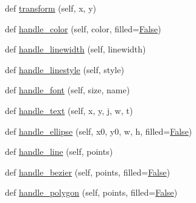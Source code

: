\begin{DoxyCompactItemize}
\item 
def \hyperlink{classsmacc__viewer_1_1xdot_1_1xdot_1_1XDotAttrParser_ad3be1e9782edc07698a04d232c5fc02b}{transform} (self, x, y)
\item 
def \hyperlink{classsmacc__viewer_1_1xdot_1_1xdot_1_1XDotAttrParser_a12bdb9eaa41346cb59da418082e9d593}{handle\+\_\+color} (self, color, filled=\hyperlink{namespacesmacc__viewer_a5928e8da279785cbab9011356c3eaa87}{False})
\item 
def \hyperlink{classsmacc__viewer_1_1xdot_1_1xdot_1_1XDotAttrParser_ae95c3f6623712f78a11bebd32cc9ff0f}{handle\+\_\+linewidth} (self, linewidth)
\item 
def \hyperlink{classsmacc__viewer_1_1xdot_1_1xdot_1_1XDotAttrParser_af20401187b9882d95a52efa2e60701cc}{handle\+\_\+linestyle} (self, style)
\item 
def \hyperlink{classsmacc__viewer_1_1xdot_1_1xdot_1_1XDotAttrParser_a48085d32c8d968444dda73eed027fa74}{handle\+\_\+font} (self, size, name)
\item 
def \hyperlink{classsmacc__viewer_1_1xdot_1_1xdot_1_1XDotAttrParser_a77cca3ea20aaf8b6caf2c41705b1611f}{handle\+\_\+text} (self, x, y, j, w, t)
\item 
def \hyperlink{classsmacc__viewer_1_1xdot_1_1xdot_1_1XDotAttrParser_adc9b09c15320e5aebc7f2ddaa3012aa5}{handle\+\_\+ellipse} (self, x0, y0, w, h, filled=\hyperlink{namespacesmacc__viewer_a5928e8da279785cbab9011356c3eaa87}{False})
\item 
def \hyperlink{classsmacc__viewer_1_1xdot_1_1xdot_1_1XDotAttrParser_adc6f90163757276b983f4701e240a011}{handle\+\_\+line} (self, points)
\item 
def \hyperlink{classsmacc__viewer_1_1xdot_1_1xdot_1_1XDotAttrParser_a17a326016861ed874135b3c4a55cbabe}{handle\+\_\+bezier} (self, points, filled=\hyperlink{namespacesmacc__viewer_a5928e8da279785cbab9011356c3eaa87}{False})
\item 
def \hyperlink{classsmacc__viewer_1_1xdot_1_1xdot_1_1XDotAttrParser_a52d83c9c11f45a1587ef9a7942435615}{handle\+\_\+polygon} (self, points, filled=\hyperlink{namespacesmacc__viewer_a5928e8da279785cbab9011356c3eaa87}{False})
\end{DoxyCompactItemize}
